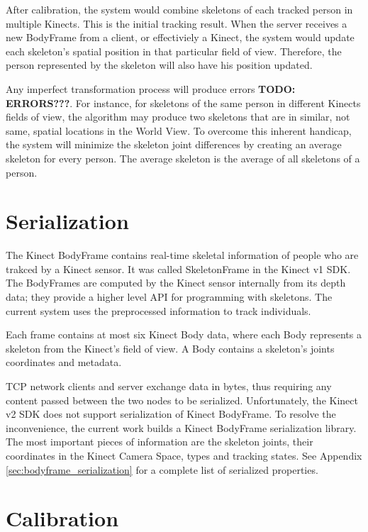 After calibration, the system would combine skeletons of each tracked person in multiple Kinects. This is the initial tracking result. When the server receives a new BodyFrame from a client, or effectiviely a Kinect, the system would update each skeleton's spatial position in that particular field of view. Therefore, the person represented by the skeleton will also have his position updated.

Any imperfect transformation process will produce errors \textbf{TODO: ERRORS???}. For instance, for skeletons of the same person in different Kinects fields of view, the algorithm may produce two skeletons that are in similar, not same, spatial locations in the World View. To overcome this inherent handicap, the system will minimize the skeleton joint differences by creating an average skeleton for every person. The average skeleton is the average of all skeletons of a person.

\section{Serialization}
\label{sec:current_approach_serialization}

The Kinect BodyFrame contains real-time skeletal information of people who are trakced by a Kinect sensor. It was called SkeletonFrame in the Kinect v1 SDK. The BodyFrames are computed by the Kinect sensor internally from its depth data; they provide a higher level API for programming with skeletons. The current system uses the preprocessed information to track individuals.

Each frame contains at most six Kinect Body data, where each Body represents a skeleton from the Kinect's field of view. A Body contains a skeleton's joints coordinates and metadata.

TCP network clients and server exchange data in bytes, thus requiring any content passed between the two nodes to be serialized. Unfortunately, the Kinect v2 SDK does not support serialization of Kinect BodyFrame. To resolve the inconvenience, the current work builds a Kinect BodyFrame serialization library. The most important pieces of information are the skeleton joints, their coordinates in the Kinect Camera Space, types and tracking states. See Appendix \ref{sec:bodyframe_serialization} for a complete list of serialized properties.

\section{Calibration}
\label{sec:current_approach_calibration}

